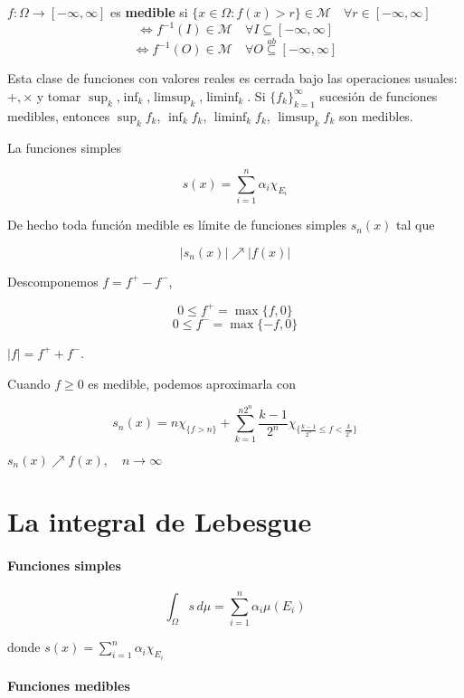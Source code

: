 \begin{fdefinition}
    $f:\Omega\to [-\infty,\infty]$ es \textbf{medible} si $\{x\in \Omega:f(x)>r\}\in\mathcal{M}\quad \forall r\in[-\infty,\infty]$
    \[\iff f^{-1}(I)\in \mathcal{M}\quad\forall I\subseteq [-\infty,\infty]\]
    \[\iff f^{-1}(O)\in\mathcal{M}\quad\forall O\overset{ab}{\subseteq}[-\infty,\infty]\]
\end{fdefinition}

Esta clase de funciones con valores reales es cerrada bajo las operaciones usuales: $+,\times$ y tomar $\sup_k$,$\inf_k$,$\limsup_k$,$\liminf_k$. Si $\{f_k\}_{k=1}^\infty$ sucesión de funciones medibles, entonces $\sup_k f_k$, $\inf_k f_k$, $\liminf_k f_k$, $\limsup_k f_k$ son medibles.

\begin{fexample}
    La funciones simples 

    \[s(x)=\sum_{i=1}^n\alpha_i\chi_{E_i}\]

    De hecho toda función medible es límite de funciones simples $s_n(x)$ tal que 

    \[|s_n(x)|\nearrow|f(x)|\]

    Descomponemos $f=f^+-f^-$,

    \[0\leq f^+=\max\{f,0\}\]
    \[0\leq f^-=\max\{-f,0\}\]

    $|f|=f^+ + f^-$.

    Cuando $f\geq 0$ es medible, podemos aproximarla con 

    \[s_n(x)=n\chi_{\{f>n\}}+\sum_{k=1}^{n2^n}\frac{k-1}{2^n}\chi_{\{\frac{k-1}{2^n}\leq f<\frac{k}{2^n}\}}\]

    $s_n(x)\nearrow f(x),\quad n\to\infty$
\end{fexample}

\section{La integral de Lebesgue}

\paragraph{Funciones simples}

\[\int_\Omega s\,d\mu=\sum_{i=1}^n \alpha_i \mu(E_i)\]

donde $s(x)=\sum_{i=1}^n \alpha_i\chi_{E_i}$

\paragraph{Funciones medibles}

